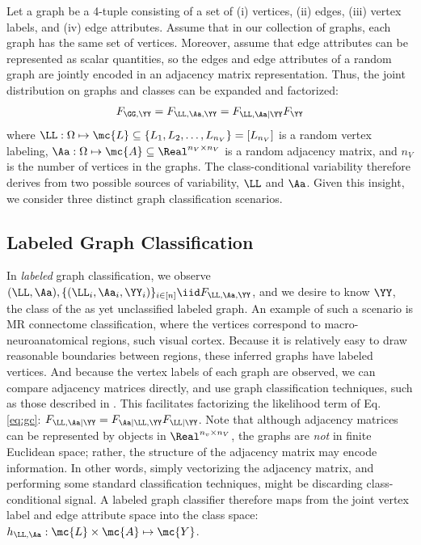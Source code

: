 \documentclass[10pt,journal,cspaper,compsoc]{IEEEtran}
\begin{document}
Let a graph be a 4-tuple consisting of a set of (i) vertices, (ii) edges, (iii) vertex labels, and (iv)  edge attributes. %
Assume that in our collection of graphs, each graph has the same set of vertices.  Moreover, assume that edge attributes can be represented as scalar quantities, so the edges and edge attributes of a random graph are jointly encoded in an adjacency matrix representation.  Thus, the joint distribution on graphs and classes can be expanded and factorized:
\begin{align} \label{eq:gc}
	F_{\GG,\YY}=F_{\LL,\Aa,\YY}=F_{\LL,\Aa | \YY} F_{\YY}
\end{align}
where $\LL: \Omega \mapsto \mc{L} \subseteq \{L_1,L_2,\ldots,L_{n_V}\}=[L_{n_V}]$ is a random vertex labeling,  $\Aa: \Omega \mapsto \mc{A} \subseteq \Real^{n_V \times n_V}$ is a random adjacency matrix, and $n_V$ is the number of vertices in the graphs.  The class-conditional variability therefore derives from two possible sources of variability, $\LL$ and $\Aa$.  Given this insight, we consider three distinct graph classification scenarios.


\subsection{Labeled Graph Classification} %
\label{sub:labeled_graph_classification}

In \emph{labeled} graph classification, we observe $(\LL,\Aa), \{(\LL_i,\Aa_i,\YY_i)\}_{i \in [n]} \iid F_{\LL,\Aa,\YY}$, and we desire to know $\YY$, the class of the as yet unclassified labeled graph.  
An example of such a scenario is MR connectome classification, where the vertices correspond to macro-neuroanatomical regions, such visual cortex.   Because it is relatively easy to draw reasonable boundaries between regions, these inferred graphs have labeled vertices. And because the vertex labels of each graph are observed, we can compare adjacency matrices directly, and use graph classification techniques, such as those described in \cite{Vogelstein2011}.  This facilitates factorizing the likelihood term of Eq. \eqref{eq:gc}:  $F_{\LL,\Aa|\YY}=F_{\Aa | \LL, \YY} F_{\LL|\YY}$.  Note that although adjacency matrices can be represented by objects in $\Real^{n_v \times n_V}$, the graphs are \emph{not} in finite Euclidean space; rather, the structure of the adjacency matrix may encode information.  In other words, simply vectorizing the adjacency matrix, and performing some standard classification techniques, might be discarding class-conditional signal.  A labeled graph classifier therefore maps from the joint vertex label and edge attribute space into the class space: $h_{\LL,\Aa}: \mc{L} \times \mc{A} \mapsto \mc{Y}$.
\end{document}
